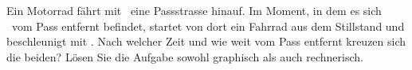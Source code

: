 Ein Motorrad fährt mit \vMoO\ eine Passstrasse hinauf. Im Moment, in dem es sich \dMoO\ vom Pass entfernt befindet, startet von dort ein Fahrrad aus dem Stillstand und beschleunigt mit \aFaO. Nach welcher Zeit und wie weit vom Pass entfernt kreuzen sich die beiden? Lösen Sie die Aufgabe sowohl graphisch als auch rechnerisch.
